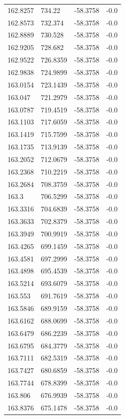 \begin{table}[H]
\begin{tabular}{llll}
162.8257 & 734.22 & -58.3758 & -0.0 \\
162.8573 & 732.374 & -58.3758 & -0.0 \\
162.8889 & 730.528 & -58.3758 & -0.0 \\
162.9205 & 728.682 & -58.3758 & -0.0 \\
162.9522 & 726.8359 & -58.3758 & -0.0 \\
162.9838 & 724.9899 & -58.3758 & -0.0 \\
163.0154 & 723.1439 & -58.3758 & -0.0 \\
163.047 & 721.2979 & -58.3758 & -0.0 \\
163.0787 & 719.4519 & -58.3758 & -0.0 \\
163.1103 & 717.6059 & -58.3758 & -0.0 \\
163.1419 & 715.7599 & -58.3758 & -0.0 \\
163.1735 & 713.9139 & -58.3758 & -0.0 \\
163.2052 & 712.0679 & -58.3758 & -0.0 \\
163.2368 & 710.2219 & -58.3758 & -0.0 \\
163.2684 & 708.3759 & -58.3758 & -0.0 \\
163.3 & 706.5299 & -58.3758 & -0.0 \\
163.3316 & 704.6839 & -58.3758 & -0.0 \\
163.3633 & 702.8379 & -58.3758 & -0.0 \\
163.3949 & 700.9919 & -58.3758 & -0.0 \\
163.4265 & 699.1459 & -58.3758 & -0.0 \\
163.4581 & 697.2999 & -58.3758 & -0.0 \\
163.4898 & 695.4539 & -58.3758 & -0.0 \\
163.5214 & 693.6079 & -58.3758 & -0.0 \\
163.553 & 691.7619 & -58.3758 & -0.0 \\
163.5846 & 689.9159 & -58.3758 & -0.0 \\
163.6162 & 688.0699 & -58.3758 & -0.0 \\
163.6479 & 686.2239 & -58.3758 & -0.0 \\
163.6795 & 684.3779 & -58.3758 & -0.0 \\
163.7111 & 682.5319 & -58.3758 & -0.0 \\
163.7427 & 680.6859 & -58.3758 & -0.0 \\
163.7744 & 678.8399 & -58.3758 & -0.0 \\
163.806 & 676.9939 & -58.3758 & -0.0 \\
163.8376 & 675.1478 & -58.3758 & -0.0 \\

\end{tabular}
\end{table}
